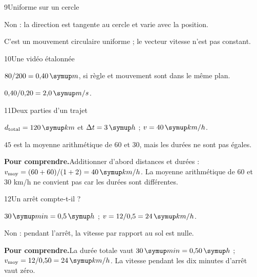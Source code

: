\par\noindent\begin{minipage}{\linewidth}
\begin{corrige}{9}{Uniforme sur un cercle}
\begin{questions}
\item Non : la direction est tangente au cercle et varie avec la position.
\item C’est un mouvement circulaire uniforme ; le vecteur vitesse n’est pas constant.
\end{questions}
\end{corrige}
\end{minipage}
\par\noindent\begin{minipage}{\linewidth}
\begin{corrige}{10}{Une vidéo étalonnée}
\begin{questions}
\item $80/200=0{,}40\unite m$, si règle et mouvement sont dans le même plan.
\item $0{,}40/0{,}20=2{,}0\unite{m/s}$.
\end{questions}
\end{corrige}
\end{minipage}
\par\noindent\begin{minipage}{\linewidth}
\begin{corrige}{11}{Deux parties d’un trajet}
\begin{questions}
\item $d_{\rm total}=120\unite{km}$ et $\Delta t=3\unite h$ ; $v=40\unite{km/h}$.
\item $45$ est la moyenne arithmétique de 60 et 30, mais les durées ne sont pas égales.
\end{questions}
\par\smallskip\noindent\textbf{Pour comprendre.}\enspace Additionner d’abord distances et durées : $v_{\text{moy}}=(60+60)/(1+2)=40\unite{km/h}$. La moyenne arithmétique de 60 et 30 km/h ne convient pas car les durées sont différentes.\par
\end{corrige}
\end{minipage}
\par\noindent\begin{minipage}{\linewidth}
\begin{corrige}{12}{Un arrêt compte-t-il ?}
\begin{questions}
\item $30\unite{min}=0{,}5\unite h$ ; $v=12/0{,}5=24\unite{km/h}$.
\item Non : pendant l’arrêt, la vitesse par rapport au sol est nulle.
\end{questions}
\par\smallskip\noindent\textbf{Pour comprendre.}\enspace La durée totale vaut $30\unite{min}=0{,}50\unite h$ ; $v_{\text{moy}}=12/0{,}50=24\unite{km/h}$. La vitesse pendant les dix minutes d’arrêt vaut zéro.\par
\end{corrige}
\end{minipage}
